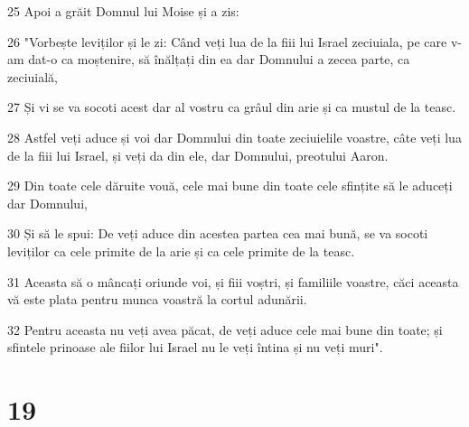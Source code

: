 \par 25 Apoi a grăit Domnul lui Moise și a zis:
\par 26 "Vorbește leviților și le zi: Când veți lua de la fiii lui Israel zeciuiala, pe care v-am dat-o ca moștenire, să înălțați din ea dar Domnului a zecea parte, ca zeciuială,
\par 27 Și vi se va socoti acest dar al vostru ca grâul din arie și ca mustul de la teasc.
\par 28 Astfel veți aduce și voi dar Domnului din toate zeciuielile voastre, câte veți lua de la fiii lui Israel, și veți da din ele, dar Domnului, preotului Aaron.
\par 29 Din toate cele dăruite vouă, cele mai bune din toate cele sfințite să le aduceți dar Domnului,
\par 30 Și să le spui: De veți aduce din acestea partea cea mai bună, se va socoti leviților ca cele primite de la arie și ca cele primite de la teasc.
\par 31 Aceasta să o mâncați oriunde voi, și fiii voștri, și familiile voastre, căci aceasta vă este plata pentru munca voastră la cortul adunării.
\par 32 Pentru aceasta nu veți avea păcat, de veți aduce cele mai bune din toate; și sfintele prinoase ale fiilor lui Israel nu le veți întina și nu veți muri".

\chapter{19}

